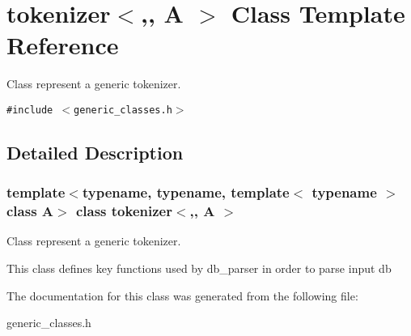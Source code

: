 \section{tokenizer$<$,, A $>$ Class Template Reference}
\label{classtokenizer}
Class represent a generic tokenizer.  


{\tt \#include $<$generic\_\-classes.h$>$}



\subsection{Detailed Description}
\subsubsection*{template$<$typename, typename, template$<$ typename $>$ class A$>$ class tokenizer$<$,, A $>$}

Class represent a generic tokenizer. 

This class defines key functions used by db\_\-parser in order to parse input db 



The documentation for this class was generated from the following file:\begin{CompactItemize}
\item 
generic\_\-classes.h\end{CompactItemize}
